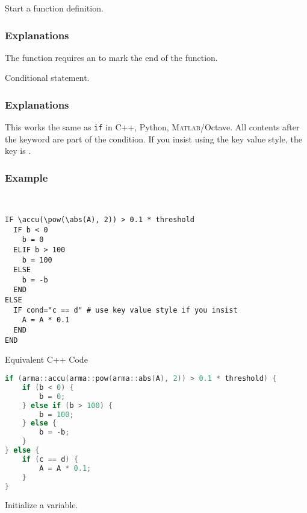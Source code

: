 Start a function definition.
\subsubsection*{Explanations}
The function requires an  to mark the end of the function.

Conditional statement.
\subsubsection*{Explanations}
This works the same as \texttt{if} in C++, Python, \textsc{Matlab}/Octave.
All contents after the  keyword are part of the condition.
If you insist using the key value style, the key is .
\subsubsection*{Example}
\begin{example}[Example of IF]~
  \begin{lstlisting}[language=mmcesim-sim]
IF \accu(\pow(\abs(A), 2)) > 0.1 * threshold
  IF b < 0
    b = 0
  ELIF b > 100
    b = 100
  ELSE
    b = -b
  END
ELSE
  IF cond="c == d" # use key value style if you insist
    A = A * 0.1
  END
END
  \end{lstlisting}
  Equivalent C++ Code
  \begin{lstlisting}[language=c++]
if (arma::accu(arma::pow(arma::abs(A), 2)) > 0.1 * threshold) {
    if (b < 0) {
        b = 0;
    } else if (b > 100) {
        b = 100;
    } else {
        b = -b;
    }
} else {
    if (c == d) {
        A = A * 0.1;
    }
}
  \end{lstlisting}
\end{example}

Initialize a variable.

